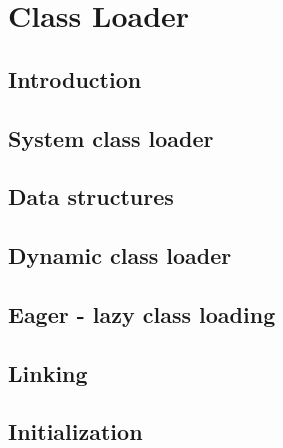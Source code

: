 \chapter{Class Loader}

\section{Introduction}

\section{System class loader}

\section{Data structures}

\section{Dynamic class loader}

\section{Eager - lazy class loading}

\section{Linking}

\section{Initialization}
